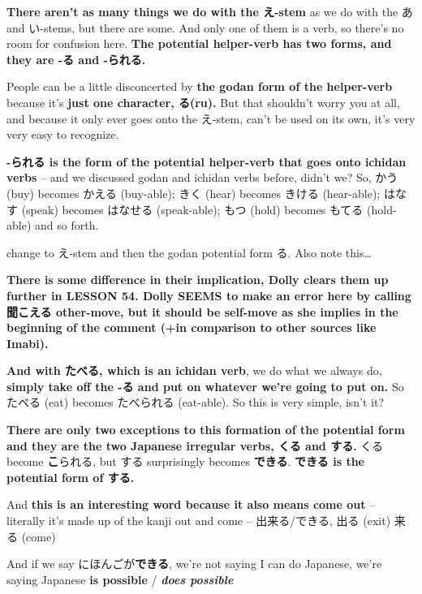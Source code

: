 {\bf There aren't as many things we do with the え-stem} as we do with the あ and い-stems, but there are some. And only one of them is a verb, so there's no room for confusion here. {\bf The potential helper-verb has two forms, and they are -る and -られる.}

People can be a little disconcerted by {\bf the godan form of the helper-verb} because it's {\bf just one character, る(ru).} But that shouldn't worry you at all, and because it only ever goes onto the え-stem, can't be used on its own, it's very very easy to recognize.

{\bf -られる is the form of the potential helper-verb that goes onto ichidan verbs} -- and we discussed godan and ichidan verbs before, didn't we? So, かう (buy) becomes かえる (buy-able); きく (hear) becomes きける (hear-able); はなす (speak) becomes はなせる (speak-able); もつ (hold) becomes もてる (hold-able) and so forth.

change to え-stem and then the godan potential form る. Also note this\ldots{}

{}

{}

{\bf There is some difference in their implication, Dolly clears them up further in LESSON 54.\crlf
Dolly SEEMS to make an error here by calling 聞こえる other-move, but it should be self-move as she implies in the beginning of the comment (+in comparison to other sources like Imabi).}

{\bf And with たべる, which is an ichidan verb}, we do what we always do, {\bf simply take off the -る and put on whatever we're going to put on.} So たべる (eat) becomes たべられる (eat-able). So this is very simple, isn't it?

{\bf There are only two exceptions to this formation of the potential form and they are the two Japanese irregular verbs, くる and する.} くる become {\bf こ}られる, but する surprisingly becomes {\bf できる}. {\bf できる is the potential form of する.}

{}

And {\bf this is an interesting word because it also means come out} -- literally it's made up of the kanji out and come -- 出来る/できる, 出る (exit) 来る (come)

{}

And if we say にほんごが{\bf できる}, we're not saying I can do Japanese, we're saying Japanese {\bf is possible} / {\bf {\em does possible}}

